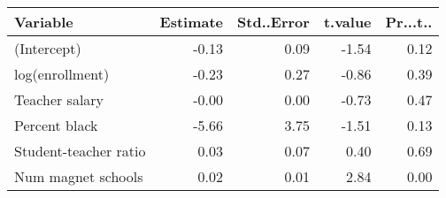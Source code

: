 \begin{tabular}{lrrrr}
  \hline
Variable & Estimate & Std..Error & t.value & Pr...t.. \\ 
  \hline
(Intercept) & -0.13 & 0.09 & -1.54 & 0.12 \\ 
  log(enrollment) & -0.23 & 0.27 & -0.86 & 0.39 \\ 
  Teacher salary & -0.00 & 0.00 & -0.73 & 0.47 \\ 
  Percent black & -5.66 & 3.75 & -1.51 & 0.13 \\ 
  Student-teacher ratio & 0.03 & 0.07 & 0.40 & 0.69 \\ 
  Num magnet schools & 0.02 & 0.01 & 2.84 & 0.00 \\ 
   \hline
\end{tabular}
